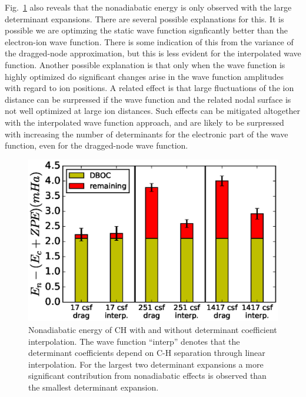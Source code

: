 \documentclass[aip,jcp,numerical,reprint]{revtex4-1}
\begin{document}
Fig.~\ref{fig:ch-interp} also reveals that the nonadiabatic energy is only observed with the large determinant expansions.  There are several possible explanations for this.  It is possible we are optimzing the static wave function signficantly better than the electron-ion wave function.  There is some indication of this from the variance of the dragged-node approximation, but this is less evident for the interpolated wave function.  Another possible explanation is that only when the wave function is highly optimized do significant changes arise in the wave function amplitudes with regard to ion positions.  A related effect is that large fluctuations of the ion distance can be surpressed if the wave function and the related nodal surface is not well optimized at large ion distances.  Such effects can be mitigated altogether with the interpolated wave function approach, and are likely to be surpressed with increasing the number of determinants for the electronic part of the wave function, even for the dragged-node wave function.  %

\begin{figure}[h]
\includegraphics[scale=0.5]{ch-only}
\caption{Nonadiabatic energy of CH with and without determinant coefficient interpolation.  The wave function ``interp'' denotes that the determinant coefficients depend on C-H separation through linear interpolation. For the largest two determinant expansions a more significant contribution from nonadiabatic effects is observed than the smallest determinant expansion. \label{fig:ch-interp} }
\end{figure}
\end{document}
